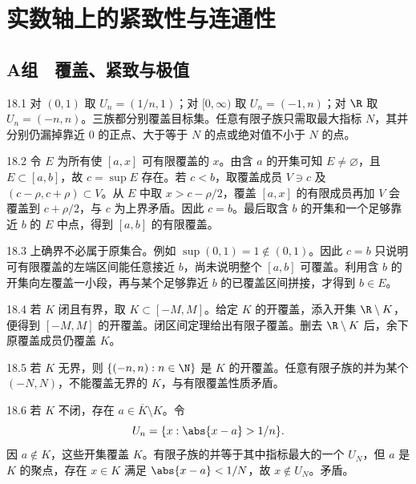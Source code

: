 \chapter{实数轴上的紧致性与连通性}

\section*{A组　覆盖、紧致与极值}

\begin{solution}{18.1}
对 \((0,1)\) 取 \(U_n=(1/n,1)\)；对 \([0,\infty)\) 取 \(U_n=(-1,n)\)；对 \(\R\) 取 \(U_n=(-n,n)\)。三族都分别覆盖目标集。任意有限子族只需取最大指标 \(N\)，其并分别仍漏掉靠近 \(0\) 的正点、大于等于 \(N\) 的点或绝对值不小于 \(N\) 的点。
\end{solution}

\begin{solution}{18.2}
令 \(E\) 为所有使 \([a,x]\) 可有限覆盖的 \(x\)。由含 \(a\) 的开集可知 \(E\ne\varnothing\)，且 \(E\subset[a,b]\)，故 \(c=\sup E\) 存在。若 \(c<b\)，取覆盖成员 \(V\ni c\) 及 \((c-\rho,c+\rho)\subset V\)。从 \(E\) 中取 \(x>c-\rho/2\)，覆盖 \([a,x]\) 的有限成员再加 \(V\) 会覆盖到 \(c+\rho/2\)，与 \(c\) 为上界矛盾。因此 \(c=b\)。最后取含 \(b\) 的开集和一个足够靠近 \(b\) 的 \(E\) 中点，得到 \([a,b]\) 的有限覆盖。
\end{solution}

\begin{solution}{18.3}
上确界不必属于原集合。例如 \(\sup(0,1)=1\notin(0,1)\)。因此 \(c=b\) 只说明可有限覆盖的左端区间能任意接近 \(b\)，尚未说明整个 \([a,b]\) 可覆盖。利用含 \(b\) 的开集向左覆盖一小段，再与某个足够靠近 \(b\) 的已覆盖区间拼接，才得到 \(b\in E\)。
\end{solution}

\begin{solution}{18.4}
若 \(K\) 闭且有界，取 \(K\subset[-M,M]\)。给定 \(K\) 的开覆盖，添入开集 \(\R\setminus K\)，便得到 \([-M,M]\) 的开覆盖。闭区间定理给出有限子覆盖。删去 \(\R\setminus K\) 后，余下原覆盖成员仍覆盖 \(K\)。
\end{solution}

\begin{solution}{18.5}
若 \(K\) 无界，则 \(\{(-n,n):n\in\N\}\) 是 \(K\) 的开覆盖。任意有限子族的并为某个 \((-N,N)\)，不能覆盖无界的 \(K\)，与有限覆盖性质矛盾。
\end{solution}

\begin{solution}{18.6}
若 \(K\) 不闭，存在 \(a\in\overline K\setminus K\)。令
\[
 U_n=\{x:\abs{x-a}>1/n\}.
\]
因 \(a\notin K\)，这些开集覆盖 \(K\)。有限子族的并等于其中指标最大的一个 \(U_N\)，但 \(a\) 是 \(K\) 的聚点，存在 \(x\in K\) 满足 \(\abs{x-a}<1/N\)，故 \(x\notin U_N\)。矛盾。
\end{solution}

